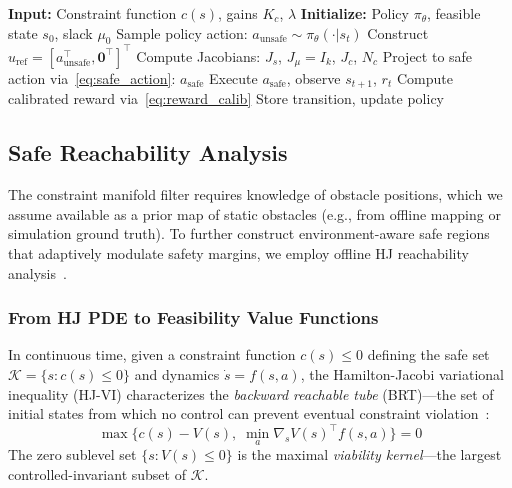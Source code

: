 \documentclass[letterpaper, 10 pt, conference]{ieeeconf}
\begin{document}
\begin{algorithm}[t]
\caption{Safe RL with Constraint Manifold Projection}
\label{alg:cosmos}
\begin{algorithmic}[1]
\State \textbf{Input:} Constraint function $c(s)$, gains $K_c$, $\lambda$
\State \textbf{Initialize:} Policy $\pi_\theta$, feasible state $s_0$, slack $\mu_0$
        \State Sample policy action: $a_{\text{unsafe}} \sim \pi_\theta(\cdot | s_t)$
        \State Construct $u_{\text{ref}} = [a_{\text{unsafe}}^\top, \mathbf{0}^\top]^\top$
        \State Compute Jacobians: $J_s$, $J_\mu = I_k$, $J_c$, $N_c$
        \State Project to safe action via~\eqref{eq:safe_action}: $a_{\text{safe}}$
        \State Execute $a_{\text{safe}}$, observe $s_{t+1}$, $r_t$
        \State Compute calibrated reward via~\eqref{eq:reward_calib}
        \State Store transition, update policy
    \EndFor
\EndFor
\end{algorithmic}
\end{algorithm}

\subsection{Safe Reachability Analysis}
\label{sec:reach}
\label{sec:reachability}

The constraint manifold filter requires knowledge of obstacle positions, which we assume available as a prior map of static obstacles (e.g., from offline mapping or simulation ground truth). To further construct environment-aware safe regions that adaptively modulate safety margins, we employ offline HJ reachability analysis~\cite{bansal2017hj_reachability}.

\subsubsection{From HJ PDE to Feasibility Value Functions}

In continuous time, given a constraint function $c(s) \leq 0$ defining the safe set $\mathcal{K} = \{s : c(s) \leq 0\}$ and dynamics $\dot{s} = f(s, a)$, the Hamilton-Jacobi variational inequality (HJ-VI) characterizes the \emph{backward reachable tube} (BRT)---the set of initial states from which no control can prevent eventual constraint violation~\cite{bansal2017hj_reachability}:
\begin{equation}
    \max\!\Big\{c(s) - V(s),\; \min_{a} \nabla_s V(s)^\top f(s, a)\Big\} = 0
    \label{eq:hj_vi}
\end{equation}
The zero sublevel set $\{s : V(s) \leq 0\}$ is the maximal \emph{viability kernel}---the largest controlled-invariant subset of $\mathcal{K}$.
\end{document}
